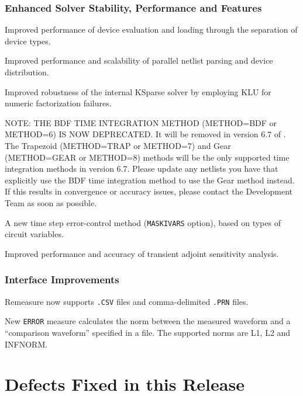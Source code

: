 \documentclass{article}
\begin{document}
\subsubsection*{Enhanced Solver Stability, Performance and Features}
\begin{XyceItemize}
  \item Improved performance of device evaluation and loading through the separation of device types.
  \item Improved performance and scalability of parallel netlist parsing and device distribution.
  \item Improved robustness of the internal KSparse solver by employing KLU for numeric factorization failures.  
  \item NOTE: THE BDF TIME INTEGRATION METHOD (METHOD=BDF or METHOD=6) IS NOW DEPRECATED. It will be removed in version 6.7 of \Xyce{}. The Trapezoid (METHOD=TRAP or METHOD=7) and Gear (METHOD=GEAR or METHOD=8) methods will be the only supported time integration methods in version 6.7. Please update any netlists you have that explicitly use the BDF time integration method to use the Gear method instead. If this results in convergence or accuracy issues, please contact the \Xyce{} Development Team as soon as possible.
  \item A new time step error-control method (\texttt{MASKIVARS} option), based on types of circuit variables.
  \item Improved performance and accuracy of transient adjoint sensitivity analysis.
\end{XyceItemize}

\subsubsection*{Interface Improvements}
\begin{XyceItemize}
  \item Remeasure now supports \texttt{.CSV} files and comma-delimited \texttt{.PRN} files.
  \item New \texttt{ERROR} measure calculates the norm between the measured waveform and 
     a ``comparison waveform'' specified in a file.  The supported norms are L1, L2 and INFNORM.
\end{XyceItemize}

\newpage
\section{Defects Fixed in this Release}

\end{document}
